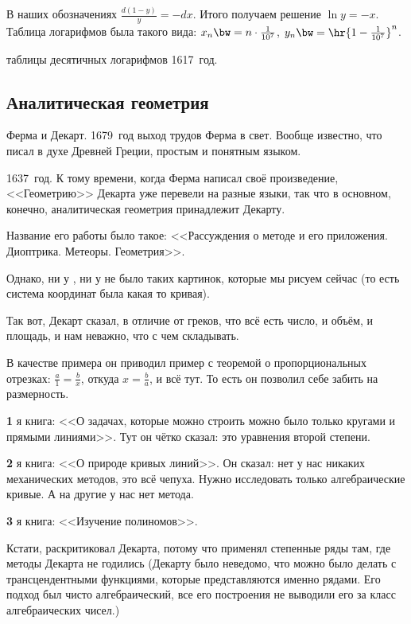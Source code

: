 \documentclass[a4paper,oneside,fleqn,10pt]{article}
\begin{document}
В наших обозначениях $\frac{d(1-y)}{y} = -dx$.  Итого получаем решение
$\ln y = -x$.  Таблица логарифмов была такого вида: $x_n \bw= n \cdot
\frac1{10^7}$, $y_n \bw= \hr{1-\frac1{10^7}}^n$.

 таблицы десятичных логарифмов
1617~год.


\subsection{Аналитическая геометрия}

Ферма и Декарт. 1679~год выход трудов Ферма в свет. Вообще известно,
что  писал в духе Древней Греции, простым и понятным
языком.

 1637~год. К тому времени, когда Ферма написал своё
произведение, <<Геометрию>> Декарта уже перевели на разные языки, так
что в основном, конечно, аналитическая геометрия принадлежит Декарту.

Название его работы было такое: <<Рассуждения о методе и его
приложения.  Диоптрика. Метеоры. Геометрия>>.

Однако, ни у , ни у  не было таких
картинок, которые мы рисуем сейчас (то есть система координат была
какая то кривая).

Так вот, Декарт сказал, в отличие от греков, что всё есть число, и
объём, и площадь, и нам неважно, что с чем складывать.

В качестве примера он приводил пример с теоремой о пропорциональных
отрезках: $\frac{a}{1} = \frac{b}{x}$, откуда $x = \frac{b}{a}$, и всё
тут.  То есть он позволил себе забить на размерность.

\textbf{1} я книга: <<О задачах, которые можно строить можно было
только кругами и прямыми линиями>>.  Тут он чётко сказал: это
уравнения второй степени.

\textbf{2} я книга: <<О природе кривых линий>>. Он сказал: нет у нас
никаких механических методов, это всё чепуха. Нужно исследовать только
алгебраические кривые. А на другие у нас нет метода.

\textbf{3} я книга: <<Изучение полиномов>>.

Кстати,  раскритиковал Декарта, потому что применял
степенные ряды там, где методы Декарта не годились (Декарту было
неведомо, что можно было делать с трансцендентными функциями, которые
представляются именно рядами.  Его подход был чисто алгебраический,
все его построения не выводили его за класс алгебраических чисел.)
\end{document}
